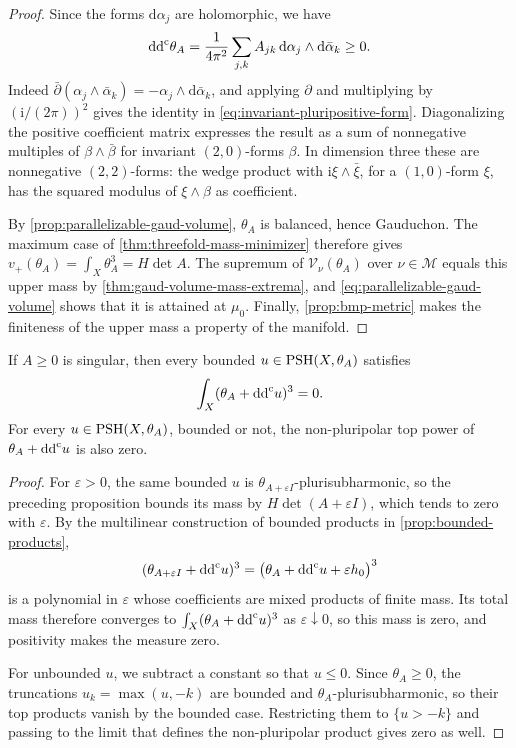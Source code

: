 \begin{proof}
Since the forms $\mathrm d\alpha_j$ are holomorphic, we have
\begin{equation}\label{eq:invariant-pluripositive-form}
 \mathrm{dd}^{\mathrm{c}}\theta_A=\frac1{4\pi^2}
       \sum_{j,k}A_{jk}\,\mathrm d\alpha_j\wedge\mathrm d\bar\alpha_k\geq0.
\end{equation}
Indeed $\bar\partial(\alpha_j\wedge\bar\alpha_k)
=-\alpha_j\wedge\mathrm d\bar\alpha_k$, and applying $\partial$ and multiplying by $(\mathrm i/(2\pi))^2$ gives the identity in \eqref{eq:invariant-pluripositive-form}. Diagonalizing the positive coefficient matrix expresses the result as a sum of nonnegative multiples of $\beta\wedge\bar\beta$ for invariant $(2,0)$-forms $\beta$. In dimension three these are nonnegative $(2,2)$-forms: the wedge product with $\mathrm i\xi\wedge\bar\xi$, for a $(1,0)$-form $\xi$, has the squared modulus of $\xi\wedge\beta$ as coefficient.

By \cref{prop:parallelizable-gaud-volume}, $\theta_A$ is balanced, hence Gauduchon. The maximum case of \cref{thm:threefold-mass-minimizer} therefore gives $v_+(\theta_A)=\int_X\theta_A^3=H\det A$. The supremum of $\mathcal V_\nu(\theta_A)$ over $\nu\in\mathscr M$ equals this upper mass by \cref{thm:gaud-volume-mass-extrema}, and \eqref{eq:parallelizable-gaud-volume} shows that it is attained at $\mu_0$. Finally, \cref{prop:bmp-metric} makes the finiteness of the upper mass a property of the manifold.
\end{proof}

\begin{corollary}\label{cor:invariant-singular-coefficient-zero-mass}
If $A\geq0$ is singular, then every bounded $u\in\mathrm{PSH}(X,\theta_A)$ satisfies
\[
 \int_X(\theta_A+\mathrm{dd}^{\mathrm{c}} u)^3=0.
\]
For every $u\in\mathrm{PSH}(X,\theta_A)$, bounded or not, the non-pluripolar top power of $\theta_A+\mathrm{dd}^{\mathrm{c}} u$ is also zero.
\end{corollary}

\begin{proof}
For $\varepsilon>0$, the same bounded $u$ is $\theta_{A+\varepsilon I}$-plurisubharmonic, so the preceding proposition bounds its mass by $H\det(A+\varepsilon I)$, which tends to zero with $\varepsilon$. By the multilinear construction of bounded products in \cref{prop:bounded-products},
\[
 (\theta_{A+\varepsilon I}+\mathrm{dd}^{\mathrm{c}} u)^3
 =\bigl(\theta_A+\mathrm{dd}^{\mathrm{c}} u+\varepsilon h_0\bigr)^3
\]
is a polynomial in $\varepsilon$ whose coefficients are mixed products of finite mass. Its total mass therefore converges to $\int_X(\theta_A+\mathrm{dd}^{\mathrm{c}} u)^3$ as $\varepsilon\downarrow0$, so this mass is zero, and positivity makes the measure zero.

For unbounded $u$, we subtract a constant so that $u\leq0$. Since $\theta_A\geq0$, the truncations $u_k=\max(u,-k)$ are bounded and $\theta_A$-plurisubharmonic, so their top products vanish by the bounded case. Restricting them to $\{u>-k\}$ and passing to the limit that defines the non-pluripolar product gives zero as well.
\end{proof}

